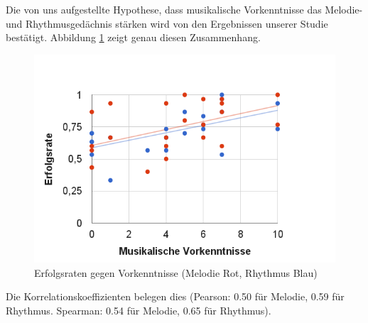 \documentclass{acm_proc_article-sp}
\begin{document}
Die von uns aufgestellte Hypothese, dass musikalische Vorkenntnisse das Melodie- und Rhythmusgedächnis stärken wird von den Ergebnissen unserer Studie bestätigt. Abbildung \ref{ErfolgGegenVorkenntnisse} zeigt genau diesen Zusammenhang.
\begin{figure}[H]
\includegraphics[width=1.0\linewidth]{Abbildungen/Einschaetzung-Melodie_Rhythmus.png}
\caption{Erfolgsraten gegen Vorkenntnisse (Melodie Rot, Rhythmus Blau)}
\label{ErfolgGegenVorkenntnisse}
\end{figure}
Die Korrelationskoeffizienten belegen dies (Pearson: 0.50 für Melodie, 0.59 für Rhythmus. Spearman: 0.54 für Melodie, 0.65 für Rhythmus).\\\\
\end{document}
